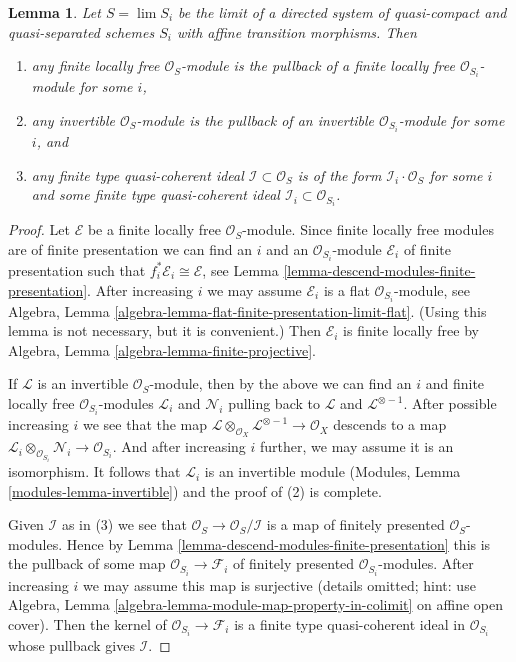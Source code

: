 \documentclass{stacks-project}
\theoremstyle{plain}
\newtheorem{lemma}[subsection]{Lemma}
\theoremstyle{definition}
\theoremstyle{remark}
\numberwithin{equation}{subsection}
\def\lim{\mathop{\mathrm{lim}}\nolimits}
\begin{document}
\begin{lemma}
\label{lemma-descend-invertible-modules}
Let $S = \lim S_i$ be the limit of a directed system of quasi-compact and
quasi-separated schemes $S_i$ with affine transition morphisms. Then
\begin{enumerate}
\item any finite locally free $\mathcal{O}_S$-module is the pullback
of a finite locally free $\mathcal{O}_{S_i}$-module for some $i$,
\item any invertible $\mathcal{O}_S$-module is the pullback of an invertible
$\mathcal{O}_{S_i}$-module for some $i$, and
\item any finite type quasi-coherent ideal $\mathcal{I} \subset \mathcal{O}_S$
is of the form $\mathcal{I}_i \cdot \mathcal{O}_S$ for some $i$ and some
finite type quasi-coherent ideal $\mathcal{I}_i \subset \mathcal{O}_{S_i}$.
\end{enumerate}
\end{lemma}

\begin{proof}
Let $\mathcal{E}$ be a finite locally free $\mathcal{O}_S$-module. Since
finite locally free modules are of finite presentation we can find an $i$
and an $\mathcal{O}_{S_i}$-module $\mathcal{E}_i$ of finite presentation
such that $f_i^*\mathcal{E}_i \cong \mathcal{E}$, see
Lemma \ref{lemma-descend-modules-finite-presentation}.
After increasing $i$ we may assume $\mathcal{E}_i$ is a flat
$\mathcal{O}_{S_i}$-module, see
Algebra, Lemma \ref{algebra-lemma-flat-finite-presentation-limit-flat}.
(Using this lemma is not necessary, but it is convenient.)
Then $\mathcal{E}_i$ is finite locally free by
Algebra, Lemma \ref{algebra-lemma-finite-projective}.

\medskip\noindent
If $\mathcal{L}$ is an invertible $\mathcal{O}_S$-module,
then by the above we can find an $i$ and finite locally
free $\mathcal{O}_{S_i}$-modules $\mathcal{L}_i$
and $\mathcal{N}_i$ pulling back to $\mathcal{L}$ and
$\mathcal{L}^{\otimes -1}$. After possible increasing
$i$ we see that the map
$\mathcal{L} \otimes_{\mathcal{O}_X} \mathcal{L}^{\otimes -1}
\to \mathcal{O}_X$ descends to a map
$\mathcal{L}_i \otimes_{\mathcal{O}_{S_i}} \mathcal{N}_i \to
\mathcal{O}_{S_i}$. And after increasing $i$ further, we
may assume it is an isomorphism. It follows that
$\mathcal{L}_i$ is an invertible module
(Modules, Lemma \ref{modules-lemma-invertible}) and
the proof of (2) is complete.

\medskip\noindent
Given $\mathcal{I}$ as in (3) we see that
$\mathcal{O}_S \to \mathcal{O}_S/\mathcal{I}$
is a map of finitely presented $\mathcal{O}_S$-modules.
Hence by Lemma \ref{lemma-descend-modules-finite-presentation}
this is the pullback of some
map $\mathcal{O}_{S_i} \to \mathcal{F}_i$ of finitely
presented $\mathcal{O}_{S_i}$-modules. After increasing $i$
we may assume this map is surjective (details omitted; hint: use
Algebra, Lemma \ref{algebra-lemma-module-map-property-in-colimit}
on affine open cover). Then the kernel of $\mathcal{O}_{S_i} \to \mathcal{F}_i$
is a finite type quasi-coherent ideal in $\mathcal{O}_{S_i}$
whose pullback gives $\mathcal{I}$.
\end{proof}
\end{document}
